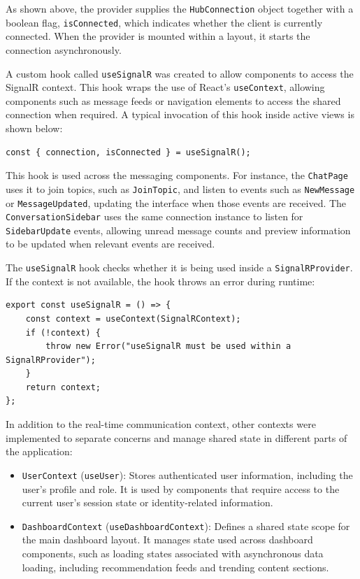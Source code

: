 As shown above, the provider supplies the \texttt{HubConnection} object together with a boolean flag, \texttt{isConnected}, which indicates whether the client is currently connected. When the provider is mounted within a layout, it starts the connection asynchronously.

A custom hook called \texttt{useSignalR} was created to allow components to access the SignalR context. This hook wraps the use of React's \texttt{useContext}, allowing components such as message feeds or navigation elements to access the shared connection when required. A typical invocation of this hook inside active views is shown below:

\begin{lstlisting}[caption={Consuming the useSignalR hook}, label={lst:use-signalr-consumption}]
const { connection, isConnected } = useSignalR();
\end{lstlisting}

This hook is used across the messaging components. For instance, the \texttt{ChatPage} uses it to join topics, such as \texttt{JoinTopic}, and listen to events such as \texttt{NewMessage} or \texttt{MessageUpdated}, updating the interface when those events are received. The \texttt{ConversationSidebar} uses the same connection instance to listen for \texttt{SidebarUpdate} events, allowing unread message counts and preview information to be updated when relevant events are received.

The \texttt{useSignalR} hook checks whether it is being used inside a \texttt{SignalRProvider}. If the context is not available, the hook throws an error during runtime:

\begin{lstlisting}[caption={useSignalR hook implementation}, label={lst:use-signalr-hook}]
export const useSignalR = () => {
    const context = useContext(SignalRContext);
    if (!context) {
        throw new Error("useSignalR must be used within a SignalRProvider");
    }
    return context;
};
\end{lstlisting}

In addition to the real-time communication context, other contexts were implemented to separate concerns and manage shared state in different parts of the application:

\begin{itemize}
\item \texttt{UserContext} (\texttt{useUser}): Stores authenticated user information, including the user's profile and role. It is used by components that require access to the current user's session state or identity-related information.
\item \texttt{DashboardContext} (\texttt{useDashboardContext}): Defines a shared state scope for the main dashboard layout. It manages state used across dashboard components, such as loading states associated with asynchronous data loading, including recommendation feeds and trending content sections.
\end{itemize}


